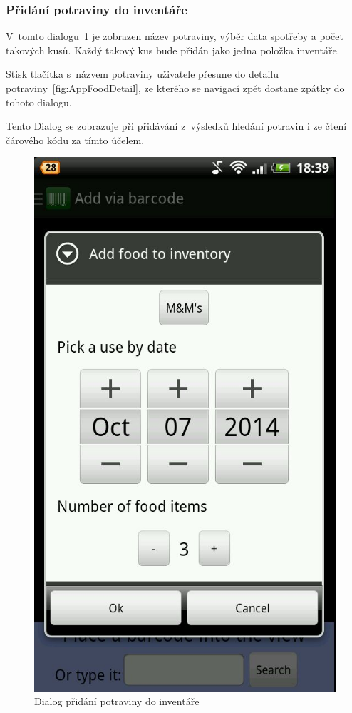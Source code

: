 \documentclass[thesis=B,czech]{FITthesis}[2013/10/20]
\begin{document}
\clearpage

\subsubsection{Přidání potraviny do inventáře}

V~tomto dialogu~\ref{fig:AppScanAddFood} je zobrazen název potraviny, výběr data spotřeby a počet takových kusů. Každý takový kus bude přidán jako jedna položka inventáře.

Stisk tlačítka s~názvem potraviny uživatele přesune do detailu potraviny~\ref{fig:AppFoodDetail}, ze kterého se navigací zpět dostane zpátky do tohoto dialogu.

Tento Dialog se zobrazuje při přidávání z~výsledků hledání potravin i ze čtení čárového kódu za tímto účelem.

\begin{figure}[H]
  \centering
  \includegraphics[scale=0.4]{screenshots/app_scan_add_food.jpg}
  \caption{Dialog přidání potraviny do inventáře}
  \label{fig:AppScanAddFood}
\end{figure}
\end{document}
